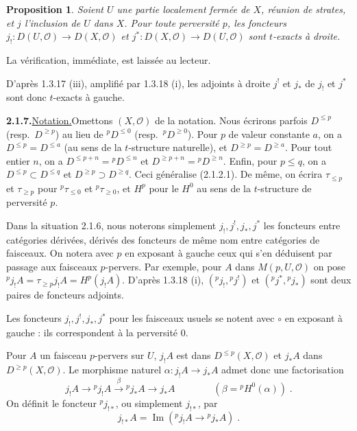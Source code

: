 \documentclass[12pt,a4paper]{article}
\theoremstyle{plain}
\newtheorem{proposition}[theorem]{Proposition}
\theoremstyle{definition}
\DeclareMathOperator{\im}{Im}
\begin{document}
\begin{proposition}\label{prop:2.1.6}
Soient $U$ une partie localement ferm\'ee de $X$, r\'eunion de strates, et $j$ l'inclusion de $U$ dans $X$. Pour toute perversit\'e $p$, les foncteurs $j_! : D(U, \mathcal{O}) \to D(X, \mathcal{O})$ et $j^* : D(X, \mathcal{O}) \to D(U, \mathcal{O})$ sont $t$-exacts \`a droite.
\end{proposition}

La v\'erification, imm\'ediate, est laiss\'ee au lecteur.

D'apr\`es 1.3.17 (iii), amplifi\'e par 1.3.18 (i), les adjoints \`a droite $j^!$ et $j_*$ de $j_!$ et $j^*$ sont donc $t$-exacts \`a gauche.

\smallskip
\noindent\textbf{2.1.7.}\quad \underline{Notation.}\quad Omettons $(X, \mathcal{O})$ de la notation. Nous \'ecrirons parfois $D^{\leqslant p}$ (resp.\ $D^{\geqslant p}$) au lieu de ${}^p D^{\leqslant 0}$ (resp.\ ${}^p D^{\geqslant 0}$). Pour $p$ de valeur constante $a$, on a $D^{\leqslant p} = D^{\leqslant a}$ (au sens de la $t$-structure naturelle), et $D^{\geqslant p} = D^{\geqslant a}$. Pour tout entier $n$, on a $D^{\leqslant p+n} = {}^p D^{\leqslant n}$ et $D^{\geqslant p+n} = {}^p D^{\geqslant n}$. Enfin, pour $p \leqslant q$, on a $D^{\leqslant p} \subset D^{\leqslant q}$ et $D^{\geqslant p} \supset D^{\geqslant q}$. Ceci g\'en\'eralise (2.1.2.1). De m\^eme, on \'ecrira $\tau_{\leqslant p}$ et $\tau_{\geqslant p}$ pour ${}^p \tau_{\leqslant 0}$ et ${}^p \tau_{\geqslant 0}$, et $H^p$ pour le $H^0$ au sens de la $t$-structure de perversit\'e $p$.

Dans la situation 2.1.6, nous noterons simplement $j_!, j^!, j_*, j^*$ les foncteurs entre cat\'egories d\'eriv\'ees, d\'eriv\'es des foncteurs de m\^eme nom entre cat\'egories de faisceaux. On notera avec $p$ en exposant \`a gauche ceux qui s'en d\'eduisent par passage aux faisceaux $p$-pervers. Par exemple, pour $A$ dans $M(p, U, \mathcal{O})$ on pose ${}^p j_! A = \tau_{\geqslant p} j_! A = H^p(j_! A)$. D'apr\`es 1.3.18 (i), $({}^p j_!, {}^p j^!)$ et $({}^p j^*, {}^p j_*)$ sont deux paires de foncteurs adjoints.

Les foncteurs $j_!, j^!, j_*, j^*$ pour les faisceaux usuels se notent avec $\circ$ en exposant \`a gauche : ils correspondent \`a la perversit\'e 0.

Pour $A$ un faisceau $p$-pervers sur $U$, $j_! A$ est dans $D^{\leqslant p}(X, \mathcal{O})$ et $j_* A$ dans $D^{\geqslant p}(X, \mathcal{O})$. Le morphisme naturel $\alpha : j_! A \to j_* A$ admet donc une factorisation
\[
j_! A \to {}^p j_! A \xrightarrow{\;\beta\;} {}^p j_* A \to j_* A \qquad\qquad (\beta = {}^p H^0(\alpha))\;.
\]
On d\'efinit le foncteur ${}^p j_{!*}$, ou simplement $j_{!*}$, par
\[
j_{!*} A = \im({}^p j_! A \to {}^p j_* A)\;.
\]
\end{document}
